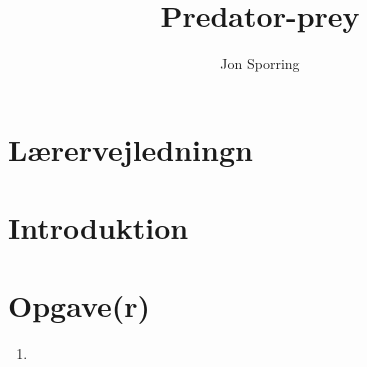\documentclass[a4paper,12pt]{article}
\title{Predator-prey}
\author{Jon Sporring}
\begin{document}
\maketitle

\section{Lærervejledningn}

\section{Introduktion}

\section{Opgave(r)}
\begin{enumerate}
\item 
\end{enumerate}
\end{document}

